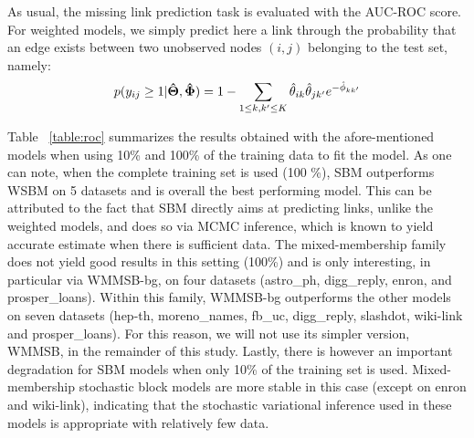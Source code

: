 As usual, the missing link prediction task is evaluated with the AUC-ROC score. For weighted models, we simply predict here a link through the probability that an edge exists between two unobserved nodes $(i,j)$ belonging to the test set, namely:
\[
p(y_{ij} \geq 1 | \boldsymbol{\hat\Theta}, \boldsymbol{\hat\Phi}) = 1 - \sum_{1 \le k,k' \le K} \hat\theta_{ik} \hat\theta_{jk'} e^{-\hat\phi_{kk'}}
\]


Table ~\ref{table:roc} summarizes the results obtained with the afore-mentioned models when using 10\% and 100\% of the training data to fit the model. As one can note, when the complete training set is used (100 \%), SBM outperforms WSBM on 5 datasets and is overall the best performing model. This can be attributed to the fact that SBM directly aims at predicting links, unlike the weighted models, and does so via MCMC inference, which is known to yield accurate estimate when there is sufficient data. The mixed-membership family does not yield good results in this setting (100\%) and is only interesting, in particular via WMMSB-bg, on four datasets (astro\_ph, digg\_reply, enron, and prosper\_loans). Within this family, WMMSB-bg outperforms the other models on seven datasets (hep-th, moreno\_names, fb\_uc, digg\_reply, slashdot, wiki-link and prosper\_loans). For this reason, we will not use its simpler version, WMMSB, in the remainder of this study. Lastly, there is however an important degradation for SBM models when only 10\% of the training set is used. Mixed-membership stochastic block models are more stable in this case (except on enron and wiki-link), indicating that the stochastic variational inference used in these models is appropriate with relatively few data. %

